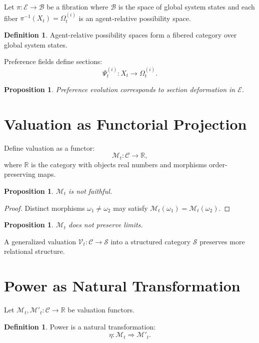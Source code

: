 \documentclass[11pt,a4paper]{article}
\newtheorem{proposition}[theorem]{Proposition}
\theoremstyle{definition}
\newtheorem{definition}[theorem]{Definition}
\theoremstyle{remark}
\begin{document}
Let $\pi : \mathcal{E} \to \mathcal{B}$ be a fibration where $\mathcal{B}$ is the space of global system states and each fiber $\pi^{-1}(X_t) = \Omega_t^{(i)}$ is an agent-relative possibility space.

\begin{definition}
Agent-relative possibility spaces form a fibered category over global system states.
\end{definition}

Preference fields define sections:
\[
\Psi_t^{(i)} : X_t \to \Omega_t^{(i)}.
\]

\begin{proposition}
Preference evolution corresponds to section deformation in $\mathcal{E}$.
\end{proposition}

\section{Valuation as Functorial Projection}

Define valuation as a functor:
\[
\mathcal{M}_t : \mathcal{C} \to \mathbb{R},
\]
where $\mathbb{R}$ is the category with objects real numbers and morphisms order-preserving maps.

\begin{proposition}
$\mathcal{M}_t$ is not faithful.
\end{proposition}

\begin{proof}
Distinct morphisms $\omega_1 \neq \omega_2$ may satisfy $\mathcal{M}_t(\omega_1) = \mathcal{M}_t(\omega_2)$.
\end{proof}

\begin{proposition}
$\mathcal{M}_t$ does not preserve limits.
\end{proposition}

A generalized valuation $\mathcal{V}_t : \mathcal{C} \to \mathcal{S}$ into a structured category $\mathcal{S}$ preserves more relational structure.

\section{Power as Natural Transformation}

Let $\mathcal{M}_t, \mathcal{M}'_t : \mathcal{C} \to \mathbb{R}$ be valuation functors.

\begin{definition}
Power is a natural transformation:
\[
\eta : \mathcal{M}_t \Rightarrow \mathcal{M}'_t.
\]
\end{definition}
\end{document}
